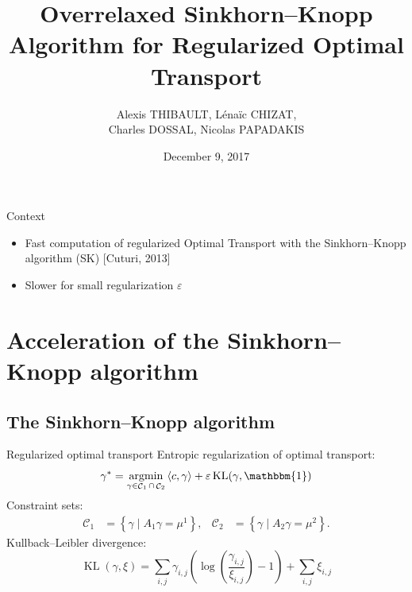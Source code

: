 \documentclass[compress]{beamer}
\title[Overrelaxed SK Algorithm]{Overrelaxed Sinkhorn--Knopp Algorithm for Regularized Optimal Transport}
\author[A. THIBAULT]{
	Alexis THIBAULT, 
	L\'ena\"ic CHIZAT,\\
	Charles DOSSAL,
	Nicolas PAPADAKIS
}
\institute[OTML'17]{Optimal Transport and Machine Learning workshop \\ NIPS 2017}
\date{December 9, 2017}
\newcommand{\scal}[2]{\left\langle #1 , #2 \right\rangle}
\DeclareMathOperator*{\argmin}{argmin}
\DeclareMathOperator{\One}{\mathbbm{1}}
\DeclareMathOperator{\Ccal}{\mathcal{C}}
\DeclareMathOperator{\KL}{KL}
\renewcommand{\epsilon}{\varepsilon}
\begin{document}
\titlepage

\begin{frame}
{Context} 
\begin{itemize}
\item Fast computation of regularized Optimal Transport with the Sinkhorn--Knopp algorithm (SK) {\color{blue}[Cuturi, 2013]}
\item Slower for small regularization $\epsilon$
\end{itemize}
\end{frame}

\section[Overrelaxing SK]{Acceleration of  the Sinkhorn--Knopp algorithm }

\subsection[SK algorithm]{The Sinkhorn--Knopp algorithm}
\begin{frame}{Regularized optimal transport}
Entropic regularization of optimal transport:
\begin{equation*} \label{eq:problem}
\gamma^* = \argmin_{\gamma \in \Ccal_1 \cap \Ccal_2}
	\scal{c}{\gamma} + \epsilon \KL(\gamma,\One)
\end{equation*}
\pause
Constraint sets:
\begin{align*}
\Ccal_1 &= \left\{ \gamma \mid A_1 \gamma = \mu^1 \right\},
&
\Ccal_2 &= \left\{ \gamma \mid A_2 \gamma = \mu^2 \right\}.
\end{align*}
\pause
Kullback--Leibler divergence:
\begin{equation*}\label{KL}
\KL(\gamma,\xi) = \sum_{i,j} \gamma_{i,j} \left( \log \left( \frac{\gamma_{i,j}}{\xi_{i,j}} \right) -1  \right) + \sum_{i,j} \xi_{i,j}
\end{equation*}
\end{frame}
\end{document}
